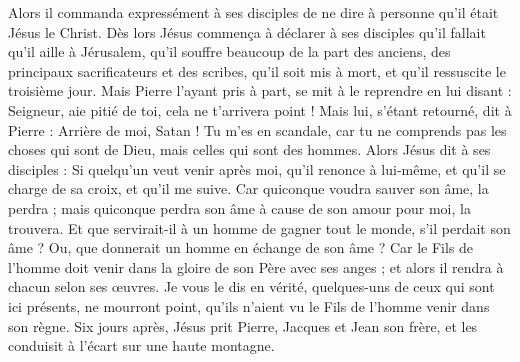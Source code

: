 \begin{multicols}{2}
Alors il commanda expressément à ses disciples de ne dire à personne qu'il était Jésus le Christ.
Dès lors Jésus commença à déclarer à ses disciples qu'il fallait qu'il aille à Jérusalem, qu'il souffre beaucoup de la part des anciens, des principaux sacrificateurs et des scribes, qu'il soit mis à mort, et qu'il ressuscite le troisième jour.
Mais Pierre l'ayant pris à part, se mit à le reprendre en lui disant : Seigneur, aie pitié de toi, cela ne t'arrivera point !
Mais lui, s'étant retourné, dit à Pierre : Arrière de moi, Satan ! Tu m'es en scandale, car tu ne comprends pas les choses qui sont de Dieu, mais celles qui sont des hommes.
Alors Jésus dit à ses disciples : Si quelqu'un veut venir après moi, qu'il renonce à lui-même, et qu'il se charge de sa croix, et qu'il me suive.
Car quiconque voudra sauver son âme, la perdra ; mais quiconque perdra son âme à cause de son amour pour moi, la trouvera.
Et que servirait-il à un homme de gagner tout le monde, s'il perdait son âme ? Ou, que donnerait un homme en échange de son âme ?
Car le Fils de l'homme doit venir dans la gloire de son Père avec ses anges ; et alors il rendra à chacun selon ses œuvres.
Je vous le dis en vérité, quelques-uns de ceux qui sont ici présents, ne mourront point, qu'ils n'aient vu le Fils de l'homme venir dans son règne.
\VerseOne{}Six jours après, Jésus prit Pierre, Jacques et Jean son frère, et les conduisit à l'écart sur une haute montagne.

\end{multicols}

